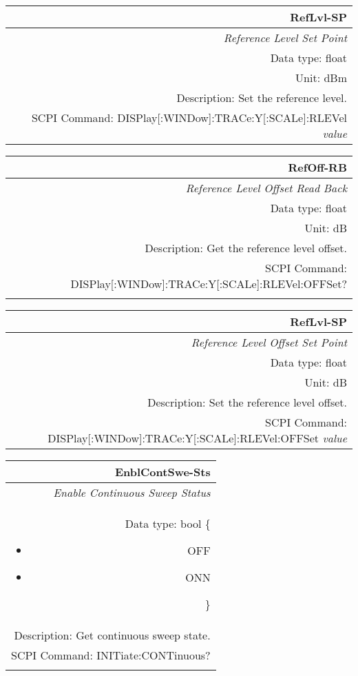 \documentclass[openany]{article}
\begin{document}
		\begin{tabular}{N}
			\hline
			\bfseries RefLvl-SP \\ \hline
			\emph{Reference Level Set Point} \\
			Data type: float \\
			Unit: dBm \\
			Description: Set the reference level. \\
			SCPI Command: DISPlay[:WINDow]:TRACe:Y[:SCALe]:RLEVel \emph{value} \\

		\end{tabular}

		\begin{tabular}{N}
			\hline
			\bfseries RefOff-RB \\ \hline
			\emph{Reference Level Offset Read Back} \\
			Data type: float \\
			Unit: dB \\
			Description: Get the reference level offset. \\
			SCPI Command: DISPlay[:WINDow]:TRACe:Y[:SCALe]:RLEVel:OFFSet? \\
			\\

		\end{tabular}

		\begin{tabular}{N}
			\hline
			\bfseries RefLvl-SP \\ \hline
			\emph{Reference Level Offset Set Point} \\
			Data type: float \\
			Unit: dB \\
			Description: Set the reference level offset. \\
			SCPI Command: DISPlay[:WINDow]:TRACe:Y[:SCALe]:RLEVel:OFFSet \emph{value} \\

		\end{tabular}

		\begin{tabular}{N}
			\hline
			\bfseries EnblContSwe-Sts \\ \hline
			\emph{Enable Continuous Sweep Status} \\
			Data type: bool \{\begin{itemize}[noitemsep]
				\small
				\item[] OFF
				\item[] ONN
			\end{itemize}\} \\
			Description: Get continuous sweep state. \\
			SCPI Command: INITiate:CONTinuous? \\
			\\

		\end{tabular}
\end{document}
